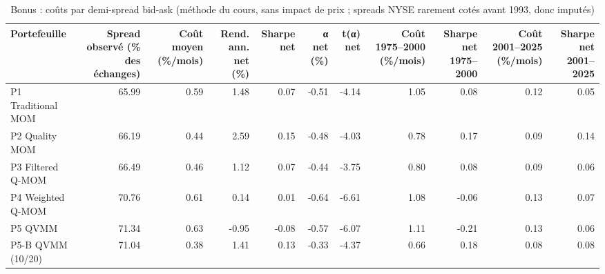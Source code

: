 \begin{table}[htbp]
\centering
\small
\caption{Bonus : coûts par demi-spread bid-ask (méthode du cours, sans impact de prix ; spreads NYSE rarement cotés avant 1993, donc imputés)}
\label{tab:T8b_couts_spread}
\begin{tabular}{lrrrrrrrrrr}
\toprule
Portefeuille & Spread observé (\% des échanges) & Coût moyen (\%/mois) & Rend. ann. net (\%) & Sharpe net & α net (\%) & t(α) net & Coût 1975–2000 (\%/mois) & Sharpe net 1975–2000 & Coût 2001–2025 (\%/mois) & Sharpe net 2001–2025 \\
\midrule
P1 Traditional MOM & 65.99 & 0.59 & 1.48 & 0.07 & -0.51 & -4.14 & 1.05 & 0.08 & 0.12 & 0.05 \\
P2 Quality MOM & 66.19 & 0.44 & 2.59 & 0.15 & -0.48 & -4.03 & 0.78 & 0.17 & 0.09 & 0.14 \\
P3 Filtered Q-MOM & 66.49 & 0.46 & 1.12 & 0.07 & -0.44 & -3.75 & 0.80 & 0.08 & 0.09 & 0.06 \\
P4 Weighted Q-MOM & 70.76 & 0.61 & 0.14 & 0.01 & -0.64 & -6.61 & 1.08 & -0.06 & 0.13 & 0.07 \\
P5 QVMM & 71.34 & 0.63 & -0.95 & -0.08 & -0.57 & -6.07 & 1.11 & -0.21 & 0.13 & 0.06 \\
P5-B QVMM (10/20) & 71.04 & 0.38 & 1.41 & 0.13 & -0.33 & -4.37 & 0.66 & 0.18 & 0.08 & 0.08 \\
\bottomrule
\end{tabular}
\end{table}